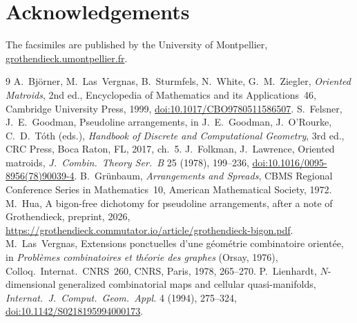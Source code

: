 \documentclass[11pt,a4paper]{amsart}
\theoremstyle{definition}
\theoremstyle{remark}
\begin{document}
\section*{Acknowledgements}
The facsimiles are published by the University of Montpellier, \href{https://grothendieck.umontpellier.fr/}{grothendieck.umontpellier.fr}.

\begin{thebibliography}{9}
 A.~Björner, M.~Las~Vergnas, B.~Sturmfels, N.~White, G.~M.~Ziegler, \emph{Oriented Matroids}, 2nd ed., Encyclopedia of Mathematics and its Applications~46, Cambridge University Press, 1999, \href{https://doi.org/10.1017/CBO9780511586507}{doi:10.1017/CBO9780511586507}.
 S.~Felsner, J.~E.~Goodman, Pseudoline arrangements, in J.~E.~Goodman, J.~O'Rourke, C.~D.~Tóth (eds.), \emph{Handbook of Discrete and Computational Geometry}, 3rd ed., CRC Press, Boca Raton, FL, 2017, ch.~5.
 J.~Folkman, J.~Lawrence, Oriented matroids, \emph{J.\ Combin.\ Theory Ser.~B} 25 (1978), 199--236, \href{https://doi.org/10.1016/0095-8956(78)90039-4}{doi:10.1016/0095-8956(78)90039-4}.
 B.~Grünbaum, \emph{Arrangements and Spreads}, CBMS Regional Conference Series in Mathematics~10, American Mathematical Society, 1972.
 M.~Hua, A bigon-free dichotomy for pseudoline arrangements, after a note of Grothendieck, preprint, 2026, \url{https://grothendieck.commutator.io/article/grothendieck-bigon.pdf}.
 M.~Las~Vergnas, Extensions ponctuelles d'une géométrie combinatoire orientée, in \emph{Problèmes combinatoires et théorie des graphes} (Orsay, 1976), Colloq.\ Internat.\ CNRS~260, CNRS, Paris, 1978, 265--270.
 P.~Lienhardt, $N$-dimensional generalized combinatorial maps and cellular quasi-manifolds, \emph{Internat.\ J.\ Comput.\ Geom.\ Appl.} 4 (1994), 275--324, \href{https://doi.org/10.1142/S0218195994000173}{doi:10.1142/S0218195994000173}.
\end{thebibliography}
\end{document}
